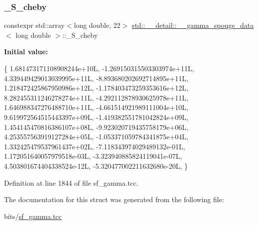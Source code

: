 \subsubsection{\texorpdfstring{\+\_\+\+S\+\_\+cheby}{\_S\_cheby}}
{\footnotesize\ttfamily constexpr std\+::array$<$long double, 22$>$ \hyperlink{structstd_1_1____detail_1_1____gamma__spouge__data}{std\+::\+\_\+\+\_\+detail\+::\+\_\+\+\_\+gamma\+\_\+spouge\+\_\+data}$<$ long double $>$\+::\+\_\+\+S\+\_\+cheby\hspace{0.3cm}{\ttfamily [static]}}

{\bfseries Initial value\+:}
\begin{DoxyCode}
\{
     1.681473171108908244e+10L,
    -1.269150315503303974e+11L,
     4.339449429013039995e+11L,
    -8.893680202692714895e+11L,
     1.218472425867950986e+12L,
    -1.178403473259353616e+12L,
     8.282455311246278274e+11L,
    -4.292112878930625978e+11L,
     1.646988347276488710e+11L,
    -4.661514921989111004e+10L,
     9.619972564515443397e+09L,
    -1.419382551781042824e+09L,
     1.454145470816386107e+08L,
    -9.923020719435758179e+06L,
     4.253557563919127284e+05L,
    -1.053371059784341875e+04L,
     1.332425479537961437e+02L,
    -7.118343974029489132e-01L,
     1.172051640057979518e-03L,
    -3.323940885824119041e-07L,
     4.503801674404338524e-12L,
    -5.320477002211632680e-20L,
      \}
\end{DoxyCode}


Definition at line 1844 of file sf\+\_\+gamma.\+tcc.



The documentation for this struct was generated from the following file\+:\begin{DoxyCompactItemize}
\item 
bits/\hyperlink{sf__gamma_8tcc}{sf\+\_\+gamma.\+tcc}\end{DoxyCompactItemize}
